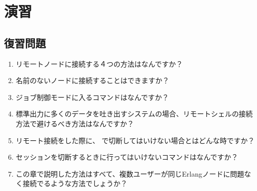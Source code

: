 \section{演習}

\subsection*{復習問題}

\begin{enumerate}
	\item リモートノードに接続する４つの方法はなんですか？
	\item 名前のないノードに接続することはできますか？
  \item ジョブ制御モードに入るコマンドはなんですか？
  \item 標準出力に多くのデータを吐き出すシステムの場合、リモートシェルの接続方法で避けるべき方法はなんですか？
  \item リモート接続をした際に、 で切断してはいけない場合とはどんな時ですか？
  \item セッションを切断するときに行ってはいけないコマンドはなんですか？
  \item この章で説明した方法はすべて、複数ユーザーが同じErlangノードに問題なく接続でるような方法でしょうか？
\end{enumerate}

